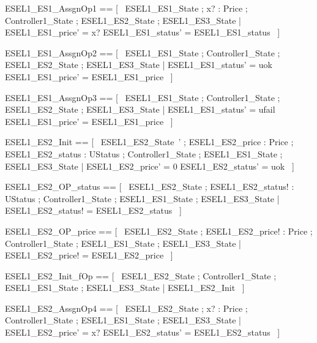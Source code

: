 \documentclass{article}
\begin{document}
\begin{zed}
	ESEL1\_ES1\_AssgnOp1 == [~  \Delta ESEL1\_ES1\_State ; x? : Price ; \Xi Controller1\_State ; \Xi ESEL1\_ES2\_State ; \Xi ESEL1\_ES3\_State | ESEL1\_ES1\_price' = x? \land ESEL1\_ES1\_status' = ESEL1\_ES1\_status  ~]
\end{zed}

\begin{zed}
	ESEL1\_ES1\_AssgnOp2 == [~  \Delta ESEL1\_ES1\_State ; \Xi Controller1\_State ; \Xi ESEL1\_ES2\_State ; \Xi ESEL1\_ES3\_State | ESEL1\_ES1\_status' = uok \land ESEL1\_ES1\_price' = ESEL1\_ES1\_price  ~]
\end{zed}

\begin{zed}
	ESEL1\_ES1\_AssgnOp3 == [~  \Delta ESEL1\_ES1\_State ; \Xi Controller1\_State ; \Xi ESEL1\_ES2\_State ; \Xi ESEL1\_ES3\_State | ESEL1\_ES1\_status' = ufail \land ESEL1\_ES1\_price' = ESEL1\_ES1\_price  ~]
\end{zed}

\begin{zed}
	ESEL1\_ES2\_Init == [~  ESEL1\_ES2\_State~' ; ESEL1\_ES2\_price : Price ; ESEL1\_ES2\_status : UStatus ; \Xi Controller1\_State ; \Xi ESEL1\_ES1\_State ; \Xi ESEL1\_ES3\_State | ESEL1\_ES2\_price' = 0 \land ESEL1\_ES2\_status' = uok  ~]
\end{zed}

\begin{zed}
	ESEL1\_ES2\_OP\_status == [~  \Xi ESEL1\_ES2\_State ; ESEL1\_ES2\_status! : UStatus ; \Xi Controller1\_State ; \Xi ESEL1\_ES1\_State ; \Xi ESEL1\_ES3\_State | ESEL1\_ES2\_status! = ESEL1\_ES2\_status  ~]
\end{zed}

\begin{zed}
	ESEL1\_ES2\_OP\_price == [~  \Xi ESEL1\_ES2\_State ; ESEL1\_ES2\_price! : Price ; \Xi Controller1\_State ; \Xi ESEL1\_ES1\_State ; \Xi ESEL1\_ES3\_State | ESEL1\_ES2\_price! = ESEL1\_ES2\_price  ~]
\end{zed}

\begin{zed}
	ESEL1\_ES2\_Init\_fOp == [~  \Xi ESEL1\_ES2\_State ; \Xi Controller1\_State ; \Xi ESEL1\_ES1\_State ; \Xi ESEL1\_ES3\_State | \lnot \pre ESEL1\_ES2\_Init  ~]
\end{zed}

\begin{zed}
	ESEL1\_ES2\_AssgnOp4 == [~  \Delta ESEL1\_ES2\_State ; x? : Price ; \Xi Controller1\_State ; \Xi ESEL1\_ES1\_State ; \Xi ESEL1\_ES3\_State | ESEL1\_ES2\_price' = x? \land ESEL1\_ES2\_status' = ESEL1\_ES2\_status  ~]
\end{zed}
\end{document}
